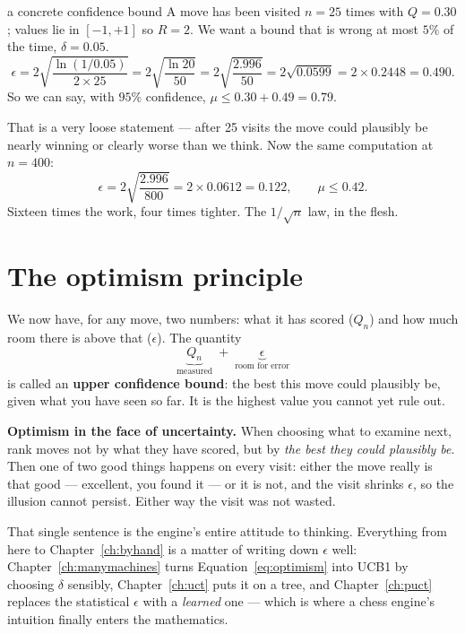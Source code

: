 \begin{worked}{a concrete confidence bound}
A move has been visited $n = 25$ times with $Q = 0.30$; values lie in $[-1,+1]$ so $R = 2$.
We want a bound that is wrong at most $5\%$ of the time, $\delta = 0.05$.
\[
\epsilon = 2\sqrt{\frac{\ln(1/0.05)}{2\times 25}}
        = 2\sqrt{\frac{\ln 20}{50}}
        = 2\sqrt{\frac{2.996}{50}}
        = 2\sqrt{0.0599} = 2\times 0.2448 = 0.490 .
\]
So we can say, with $95\%$ confidence, $\mu \le 0.30 + 0.49 = 0.79$.

That is a very loose statement --- after 25 visits the move could plausibly be nearly
winning or clearly worse than we think. Now the same computation at $n=400$:
\[
\epsilon = 2\sqrt{\frac{2.996}{800}} = 2\times 0.0612 = 0.122,\qquad \mu \le 0.42 .
\]
Sixteen times the work, four times tighter. The $1/\sqrt{n}$ law, in the flesh.
\end{worked}

\section{The optimism principle}

We now have, for any move, two numbers: what it has scored ($Q_n$) and how much room there
is above that ($\epsilon$). The quantity
\begin{equation}
  \label{eq:optimism}
  \underbrace{Q_n}_{\text{measured}} \;+\; \underbrace{\epsilon}_{\text{room for error}}
\end{equation}
is called an \textbf{upper confidence bound}: the best this move could plausibly be, given
what you have seen so far. It is the highest value you cannot yet rule out.

\begin{keyidea}
\textbf{Optimism in the face of uncertainty.} When choosing what to examine next, rank moves
not by what they have scored, but by \emph{the best they could plausibly be}. Then one of two
good things happens on every visit: either the move really is that good --- excellent, you
found it --- or it is not, and the visit shrinks $\epsilon$, so the illusion cannot persist.
Either way the visit was not wasted.
\end{keyidea}

That single sentence is the engine's entire attitude to thinking. Everything from here to
Chapter~\ref{ch:byhand} is a matter of writing down $\epsilon$ well: Chapter~\ref{ch:manymachines}
turns Equation~\eqref{eq:optimism} into UCB1 by choosing $\delta$ sensibly,
Chapter~\ref{ch:uct} puts it on a tree, and Chapter~\ref{ch:puct} replaces the statistical
$\epsilon$ with a \emph{learned} one --- which is where a chess engine's intuition finally
enters the mathematics.

